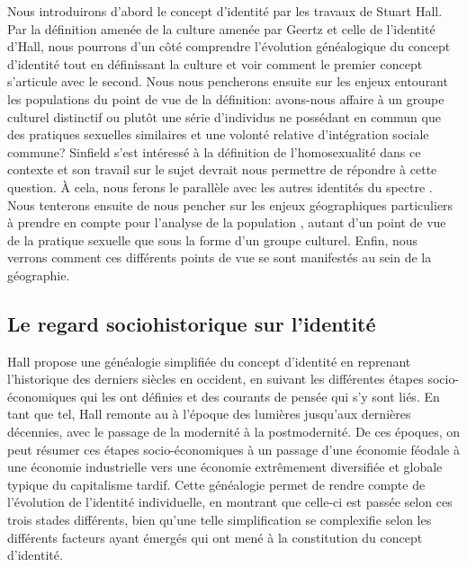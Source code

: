 Nous introduirons d'abord le concept d'identité par les travaux de Stuart Hall.
Par la définition amenée de la culture amenée par Geertz et celle de l'identité d'Hall, nous pourrons d'un côté comprendre l'évolution généalogique du concept d'identité tout en définissant la culture et voir comment le premier concept s'articule avec le second.
Nous nous pencherons ensuite sur les enjeux entourant les populations \lgbt{} du point de vue de la définition: avons-nous affaire à un groupe culturel distinctif ou plutôt une série d'individus ne possédant en commun que des pratiques sexuelles similaires et une volonté relative d'intégration sociale commune?
Sinfield s'est intéressé à la définition de l'homosexualité dans ce contexte et son travail sur le sujet devrait nous permettre de répondre à cette question.
À cela, nous ferons le parallèle avec les autres identités du spectre \lgbt{}.
Nous tenterons ensuite de nous pencher sur les enjeux géographiques particuliers à prendre en compte pour l'analyse de la population \lgbt{}, autant d'un point de vue de la pratique sexuelle que sous la forme d'un groupe culturel.
Enfin, nous verrons comment ces différents points de vue se sont manifestés au sein de la géographie.

\subsection{Le regard sociohistorique sur l'identité}
\label{sec:le_regard_sociohistoirique_sur_l_identit_} 
Hall propose une généalogie simplifiée du concept d'identité en reprenant l'historique des derniers siècles en occident, en suivant les différentes étapes socio-économiques qui les ont définies et des courants de pensée qui s'y sont liés.
En tant que tel, Hall remonte au  à l'époque des lumières jusqu'aux dernières décennies, avec le passage de la modernité à la postmodernité.
De ces époques, on peut résumer ces étapes socio-économiques à un passage d'une économie féodale à une économie industrielle vers une économie extrêmement diversifiée et globale typique du capitalisme tardif.
Cette généalogie permet de rendre compte de l'évolution de l'identité individuelle, en montrant que celle-ci est passée selon ces trois stades différents, bien qu'une telle simplification se complexifie selon les différents facteurs ayant émergés qui ont mené à la constitution du concept d'identité.

